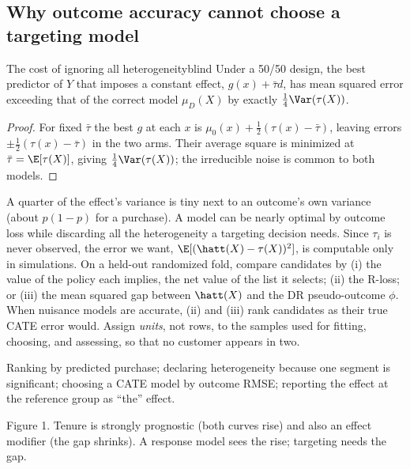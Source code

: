 \documentclass[11pt]{article}
\begin{document}
\subsection{Why outcome accuracy cannot choose a targeting model}

\begin{prop}{The cost of ignoring all heterogeneity}{blind}
Under a 50/50 design, the best predictor of $Y$ that imposes a constant effect, $g(x) + \bar\tau d$, has mean
squared error exceeding that of the correct model $\mu_D(X)$ by exactly $\tfrac14\Var(\tau(X))$.
\end{prop}
\begin{proof}
For fixed $\bar\tau$ the best $g$ at each $x$ is $\mu_0(x) + \tfrac12(\tau(x) - \bar\tau)$, leaving errors
$\pm\tfrac12(\tau(x) - \bar\tau)$ in the two arms. Their average square is minimized at $\bar\tau = \E[\tau(X)]$,
giving $\tfrac14\Var(\tau(X))$; the irreducible noise is common to both models.
\end{proof}

A quarter of the effect's variance is tiny next to an outcome's own variance (about $p(1-p)$ for a purchase).
A model can be nearly optimal by outcome loss while discarding all the heterogeneity a targeting decision
needs. Since $\tau_i$ is never observed, the error we want, $\E[(\hatt(X) - \tau(X))^2]$, is computable only in
simulations. On a held-out randomized fold, compare candidates by (i) the value of the policy each implies, the net
value of the list it selects; (ii) the R-loss; or (iii) the mean squared gap between $\hatt(X)$ and the DR pseudo-outcome $\phi$.
When nuisance models are accurate, (ii) and (iii) rank candidates as their true CATE error would. Assign
\emph{units}, not rows, to the samples used for fitting, choosing, and assessing, so that no customer appears in two.

\begin{pitfall}
Ranking by predicted purchase; declaring heterogeneity because one segment is significant; choosing a CATE
model by outcome RMSE; reporting the effect at the reference group as ``the'' effect.
\end{pitfall}

\begin{center}

\small Figure 1. Tenure is strongly prognostic (both curves rise) and also an effect modifier (the gap shrinks).
A response model sees the rise; targeting needs the gap.
\end{center}
\end{document}
